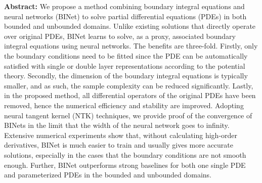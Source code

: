 \documentclass[hyperref]{article}
\numberwithin{equation}{section}
\theoremstyle{nonumberplain}
\begin{document}
	{\noindent\small{\bf Abstract:}
		We propose a method combining boundary integral equations and neural networks (BINet) to solve partial differential equations (PDEs) in both bounded and unbounded domains. 
		Unlike existing solutions that directly operate over original PDEs, BINet learns to solve, as a proxy, associated boundary integral equations using neural networks. 
		The benefits are three-fold. %
		Firstly, only the boundary conditions need to be fitted since the PDE can be automatically satisfied with single or double layer representations according to the potential theory.
		Secondly, the dimension of the boundary integral equations is typically smaller, and as such, the sample complexity can be reduced significantly. Lastly,  in the proposed method, all differential operators of the original PDEs have been removed, hence the numerical efficiency and stability are improved. 
		Adopting neural tangent kernel (NTK) techniques, 
		we provide proof of the convergence of BINets in the limit that the width of the neural network goes to infinity. Extensive numerical experiments show that, without calculating high-order derivatives, BINet is much easier to train and usually gives more accurate solutions, especially in the cases that the boundary conditions are not smooth enough. Further, BINet outperforms strong baselines for both one single PDE and parameterized PDEs in the bounded and unbounded domains.
		
		
	}
	
\end{document}
